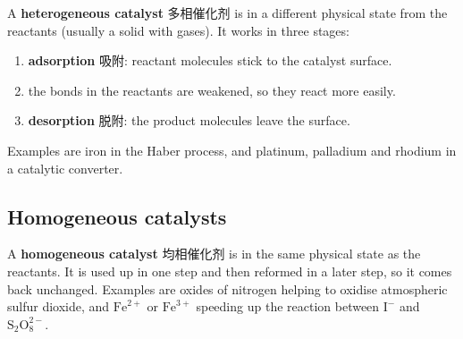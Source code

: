\documentclass[11pt]{article}
\begin{document}
A \textbf{heterogeneous catalyst} 多相催化剂 is in a different physical state from the reactants (usually a solid with gases). It works in three stages:

\begin{enumerate}
\item \textbf{adsorption} 吸附: reactant molecules stick to the catalyst surface.

\item the bonds in the reactants are weakened, so they react more easily.

\item \textbf{desorption} 脱附: the product molecules leave the surface.

\end{enumerate}

Examples are iron in the Haber process, and platinum, palladium and rhodium in a catalytic converter.

\subsection*{Homogeneous catalysts}

A \textbf{homogeneous catalyst} 均相催化剂 is in the same physical state as the reactants. It is used up in one step and then reformed in a later step, so it comes back unchanged. Examples are oxides of nitrogen helping to oxidise atmospheric sulfur dioxide, and $\text{Fe}^{2+}$ or $\text{Fe}^{3+}$ speeding up the reaction between $\text{I}^-$ and $\text{S}_2\text{O}_8^{2-}$.
\end{document}
